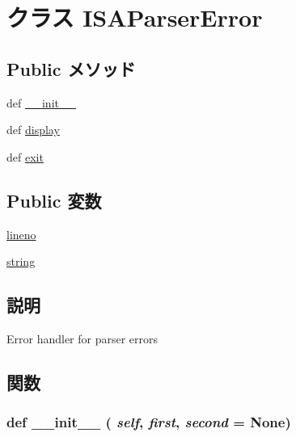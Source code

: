 \hypertarget{classisa__parser_1_1ISAParserError}{
\section{クラス ISAParserError}
\label{classisa__parser_1_1ISAParserError}
}
\subsection*{Public メソッド}
\begin{DoxyCompactItemize}
\item 
def \hyperlink{classisa__parser_1_1ISAParserError_ac775ee34451fdfa742b318538164070e}{\_\-\_\-init\_\-\_\-}
\item 
def \hyperlink{classisa__parser_1_1ISAParserError_a610714a2de3e4dadca4027bca4b71460}{display}
\item 
def \hyperlink{classisa__parser_1_1ISAParserError_a2279c3b889811e84135e2aa8e7fa5294}{exit}
\end{DoxyCompactItemize}
\subsection*{Public 変数}
\begin{DoxyCompactItemize}
\item 
\hyperlink{classisa__parser_1_1ISAParserError_a20bfe3cddeded33e0531d53de5bdaef5}{lineno}
\item 
\hyperlink{classisa__parser_1_1ISAParserError_a338951b7e7607b65262fb051e7804d91}{string}
\end{DoxyCompactItemize}


\subsection{説明}
\begin{DoxyVerb}Error handler for parser errors\end{DoxyVerb}
 

\subsection{関数}
\hypertarget{classisa__parser_1_1ISAParserError_ac775ee34451fdfa742b318538164070e}{
\subsubsection[{\_\-\_\-init\_\-\_\-}]{\setlength{\rightskip}{0pt plus 5cm}def \_\-\_\-init\_\-\_\- ( {\em self}, \/   {\em first}, \/   {\em second} = {\ttfamily None})}}
\label{classisa__parser_1_1ISAParserError_ac775ee34451fdfa742b318538164070e}



